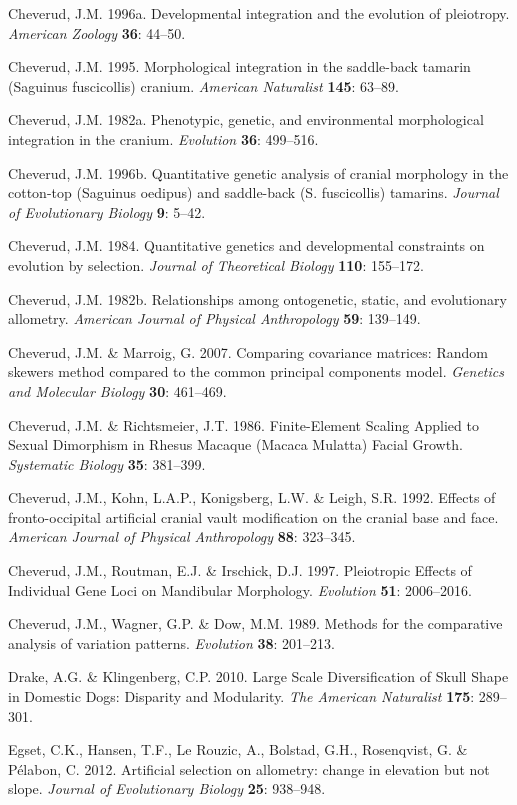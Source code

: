 \documentclass[12pt,twoside]{report}
\begin{document}
Cheverud, J.M. 1996a. Developmental integration and the evolution of
pleiotropy. \emph{American Zoology} \textbf{36}: 44--50.

Cheverud, J.M. 1995. Morphological integration in the saddle-back
tamarin (Saguinus fuscicollis) cranium. \emph{American Naturalist}
\textbf{145}: 63--89.

Cheverud, J.M. 1982a. Phenotypic, genetic, and environmental
morphological integration in the cranium. \emph{Evolution} \textbf{36}:
499--516.

Cheverud, J.M. 1996b. Quantitative genetic analysis of cranial
morphology in the cotton-top (Saguinus oedipus) and saddle-back (S.
fuscicollis) tamarins. \emph{Journal of Evolutionary Biology}
\textbf{9}: 5--42.

Cheverud, J.M. 1984. Quantitative genetics and developmental constraints
on evolution by selection. \emph{Journal of Theoretical Biology}
\textbf{110}: 155--172.

Cheverud, J.M. 1982b. Relationships among ontogenetic, static, and
evolutionary allometry. \emph{American Journal of Physical Anthropology}
\textbf{59}: 139--149.

Cheverud, J.M. \& Marroig, G. 2007. Comparing covariance matrices:
Random skewers method compared to the common principal components model.
\emph{Genetics and Molecular Biology} \textbf{30}: 461--469.

Cheverud, J.M. \& Richtsmeier, J.T. 1986. Finite-Element Scaling Applied
to Sexual Dimorphism in Rhesus Macaque (Macaca Mulatta) Facial Growth.
\emph{Systematic Biology} \textbf{35}: 381--399.

Cheverud, J.M., Kohn, L.A.P., Konigsberg, L.W. \& Leigh, S.R. 1992.
Effects of fronto-occipital artificial cranial vault modification on the
cranial base and face. \emph{American Journal of Physical Anthropology}
\textbf{88}: 323--345.

Cheverud, J.M., Routman, E.J. \& Irschick, D.J. 1997. Pleiotropic
Effects of Individual Gene Loci on Mandibular Morphology.
\emph{Evolution} \textbf{51}: 2006--2016.

Cheverud, J.M., Wagner, G.P. \& Dow, M.M. 1989. Methods for the
comparative analysis of variation patterns. \emph{Evolution}
\textbf{38}: 201--213.

Drake, A.G. \& Klingenberg, C.P. 2010. Large Scale Diversification of
Skull Shape in Domestic Dogs: Disparity and Modularity. \emph{The
American Naturalist} \textbf{175}: 289--301.

Egset, C.K., Hansen, T.F., Le Rouzic, A., Bolstad, G.H., Rosenqvist, G.
\& Pélabon, C. 2012. Artificial selection on allometry: change in
elevation but not slope. \emph{Journal of Evolutionary Biology}
\textbf{25}: 938--948.
\end{document}
